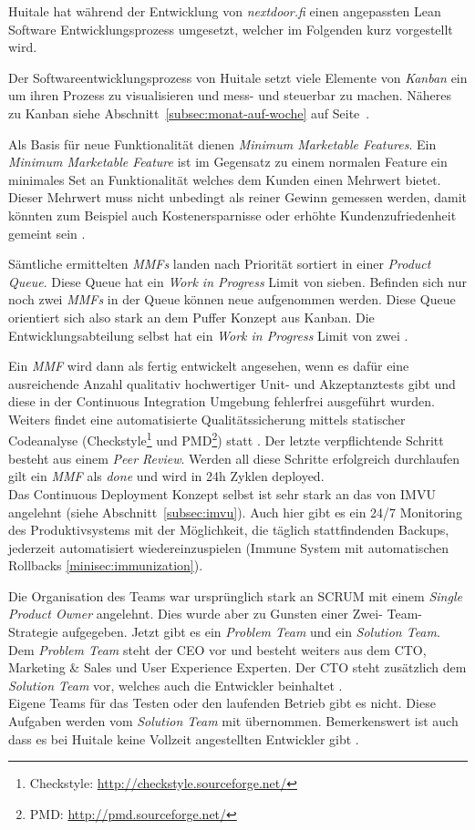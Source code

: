 Huitale hat während der Entwicklung von \emph{nextdoor.fi} einen angepassten
Lean Software Entwicklungsprozess umgesetzt, welcher im Folgenden kurz
vorgestellt wird.

 Der Softwareentwicklungsprozess von Huitale setzt viele
Elemente von \emph{Kanban} ein um ihren Prozess zu visualisieren und mess- und
steuerbar zu machen. Näheres zu Kanban siehe Abschnitt~\ref{subsec:monat-auf-woche}
auf Seite~\pageref{subsec:monat-auf-woche}. 

Als Basis für neue Funktionalität dienen \emph{Minimum Marketable Features}.
Ein \emph{Minimum Marketable Feature} ist im Gegensatz zu einem normalen
Feature ein minimales Set an Funktionalität welches dem Kunden einen Mehrwert
bietet. Dieser Mehrwert muss nicht unbedingt als reiner Gewinn gemessen
werden, damit könnten zum Beispiel auch Kostenersparnisse oder erhöhte
Kundenzufriedenheit gemeint sein \cite{denne2003software}.

Sämtliche ermittelten \emph{MMFs} landen nach Priorität sortiert in einer
\emph{Product Queue}. Diese Queue hat ein \emph{Work in
Progress} Limit von sieben. Befinden sich nur noch zwei \emph{MMFs} in der Queue
können neue aufgenommen werden. Diese Queue orientiert sich also stark an
dem Puffer Konzept aus Kanban. Die Entwicklungsabteilung selbst hat ein
\emph{Work in Progress} Limit von zwei \cite{Taipale2010}.

Ein \emph{MMF} wird dann als fertig entwickelt angesehen, wenn es dafür eine
ausreichende Anzahl qualitativ hochwertiger Unit- und Akzeptanztests gibt und
diese in der Continuous Integration Umgebung fehlerfrei ausgeführt wurden.
Weiters findet eine automatisierte Qualitätssicherung mittels statischer
Codeanalyse (Checkstyle\footnote{Checkstyle:
\url{http://checkstyle.sourceforge.net/}} und PMD\footnote{PMD:
\url{http://pmd.sourceforge.net/}}) statt \cite{Taipale2010}. Der letzte
verpflichtende Schritt besteht aus einem \emph{Peer Review}. Werden all diese
Schritte erfolgreich durchlaufen gilt ein \emph{MMF} als \emph{done} und wird
in 24h Zyklen deployed.\\
Das Continuous Deployment Konzept selbst ist sehr stark an das von IMVU
angelehnt (siehe Abschnitt~\ref{subsec:imvu}). Auch hier gibt es ein 24/7
Monitoring des Produktivsystems mit der Möglichkeit, die täglich
stattfindenden Backups, jederzeit automatisiert wiedereinzuspielen (Immune
System mit automatischen Rollbacks \ref{minisec:immunization}).

Die Organisation des Teams war ursprünglich stark an SCRUM mit einem
\emph{Single Product Owner} angelehnt. Dies wurde aber zu Gunsten einer Zwei-
Team-Strategie aufgegeben. Jetzt gibt es ein \emph{Problem Team} und ein
\emph{Solution Team}. Dem \emph{Problem Team} steht der CEO vor und besteht
weiters aus dem CTO, Marketing \& Sales und User Experience Experten. Der CTO
steht zusätzlich dem \emph{Solution Team} vor, welches auch die Entwickler
beinhaltet \cite{Taipale2010}.\\ Eigene Teams für das Testen oder den
laufenden Betrieb gibt es nicht. Diese Aufgaben werden vom \emph{Solution
Team} mit übernommen. Bemerkenswert ist auch dass es bei Huitale keine
Vollzeit angestellten Entwickler gibt \cite{huitale11}.

